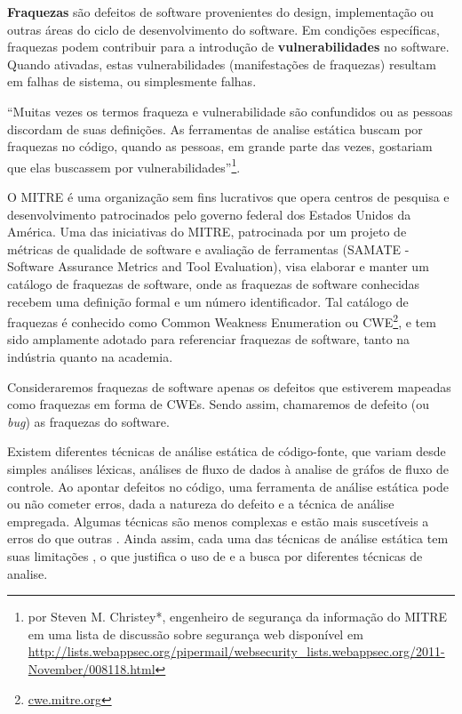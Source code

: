 \textbf{Fraquezas} são defeitos de software provenientes do design, implementação ou outras áreas do ciclo de desenvolvimento do software. Em condições específicas, fraquezas podem contribuir para a introdução de \textbf{vulnerabilidades} no software. Quando ativadas, estas vulnerabilidades (manifestações de fraquezas) resultam em falhas de sistema, ou simplesmente falhas.

``Muitas vezes os termos fraqueza e vulnerabilidade são confundidos ou as pessoas discordam de suas definições. As ferramentas de analise estática buscam por fraquezas no código, quando as pessoas, em grande parte das vezes, gostariam que elas buscassem por vulnerabilidades''\footnote{por Steven M. Christey*, engenheiro de segurança da informação do MITRE em uma lista de discussão sobre segurança web disponível em \url{http://lists.webappsec.org/pipermail/websecurity_lists.webappsec.org/2011-November/008118.html}}.

O MITRE é uma organização sem fins lucrativos que opera centros de pesquisa e desenvolvimento patrocinados pelo governo federal dos Estados Unidos da América. Uma das iniciativas do MITRE, patrocinada por um projeto de métricas de qualidade de software e avaliação de ferramentas (SAMATE - Software Assurance Metrics and Tool Evaluation), visa elaborar e manter um catálogo de fraquezas de software, onde as fraquezas de software conhecidas recebem uma definição formal e um número identificador. Tal catálogo de fraquezas é conhecido como Common Weakness Enumeration ou CWE\footnote{\url{cwe.mitre.org}}, e tem sido amplamente adotado para referenciar fraquezas de software, tanto na indústria quanto na academia.

Consideraremos fraquezas de software apenas os defeitos que estiverem mapeadas como fraquezas em forma de CWEs. Sendo assim, chamaremos de defeito (ou \textit{bug}) as fraquezas do software.

Existem diferentes técnicas de análise estática de código-fonte, que variam desde simples análises léxicas, análises de fluxo de dados à analise de gráfos de fluxo de controle. Ao apontar defeitos no código, uma ferramenta de análise estática pode ou não cometer erros, dada a natureza do defeito e a técnica de análise empregada. Algumas técnicas são menos complexas e estão mais suscetíveis a erros do que outras \cite{harvard}. Ainda assim, cada uma das técnicas de análise estática tem suas limitações \cite{pascal}, o que justifica o uso de e a busca por diferentes técnicas de analise.

